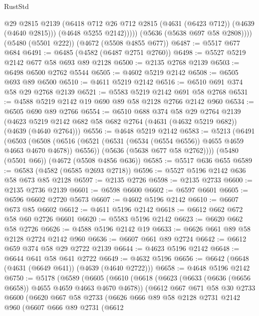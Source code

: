\begin{lexlean}{RustStd}
\begin{coremodule}
                @29
                @2815
                @2139
                (@6418 @712 @26 @712 @2815 (@4631 (@6423 @712)) (@4639 (@4640 @2815)))
                (@4648 @5255 @2142)))))
        (@5636 (@5638 @697 @58 @2808))))
    (@5480 (@5501 @222))
    (@4672 (@5508 @4855 @677))
@6487 := @5517 @677 @684
@6491 := @6485 (@4582 (@6487 @2751 @2760))
@6498 := @5527 @5219 @2142 @677 @58 @693 @89 @2128
@6500 := @2135 @2768 @2139
@6503 := @6498 @6500 @2762 @5544
@6505 := @4602 @5219 @2142
@6508 := @6505 @693 @89 @6500
@6510 := @4611 @5219 @2142
@6516 := @6510 @691 @374 @58 @29 @2768 @2139
@6521 := @5583 @5219 @2142 @691 @58 @2768
@6531 := @4588 @5219 @2142 @19 @690 @89 @58 @2128 @2766 @2142 @960
@6534 := @6505 @690 @89 @2766
@6554 := @6510
    @688
    @374
    @58
    @29
    @2764
    @2139
    (@4623 @5219 @2142 @682 @58 @682 @2764 (@4631 (@4632 @5219 @682)) (@4639 (@4640 @2764)))
@6556 := @4648 @5219 @2142
@6583 := @5213
    (@6491
      (@6503
        (@6508 (@6516 (@6521 (@6531 (@6534 (@6554 @6556)) @4655 @4659 @4663 @4670 @4678)) @6556))
        (@5636 (@5638 @677 @58 @2762))))
    (@5480 (@5501 @66))
    (@4672 (@5508 @4856 @636))
@6585 := @5517 @636 @655
@6589 := @6583 (@4582 (@6585 @2693 @2718))
@6596 := @5527 @5196 @2142 @636 @58 @673 @85 @2128
@6597 := @2135 @2726
@6598 := @2135 @2733
@6600 := @2135 @2736 @2139
@6601 := @6598 @6600
@6602 := @6597 @6601
@6605 := @6596 @6602 @2720 @5673
@6607 := @4602 @5196 @2142
@6610 := @6607 @673 @85 @6602
@6612 := @4611 @5196 @2142
@6618 := @6612 @662 @672 @58 @60 @2726 @6601
@6620 := @5583 @5196 @2142
@6623 := @6620 @662 @58 @2726
@6626 := @4588 @5196 @2142 @19
@6633 := @6626 @661 @89 @58 @2128 @2724 @2142 @960
@6636 := @6607 @661 @89 @2724
@6642 := @6612 @659 @374 @58 @29 @2722 @2139
@6644 := @4623 @5196 @2142
@6648 := @6644 @641 @58 @641 @2722
@6649 := @4632 @5196
@6656 := @6642 (@6648 (@4631 (@6649 @641)) (@4639 (@4640 @2722)))
@6658 := @4648 @5196 @2142
@6750 := @5178
    (@6589
      (@6605
        (@6610
          (@6618
            (@6623 (@6633 (@6636 (@6656 @6658)) @4655 @4659 @4663 @4670 @4678))
            (@6612
              @667
              @671
              @58
              @30
              @2733
              @6600
              (@6620
                @667
                @58
                @2733
                (@6626
                  @666
                  @89
                  @58
                  @2128
                  @2731
                  @2142
                  @960
                  (@6607
                    @666
                    @89
                    @2731
                    (@6612

\end{coremodule}
\end{lexlean}
